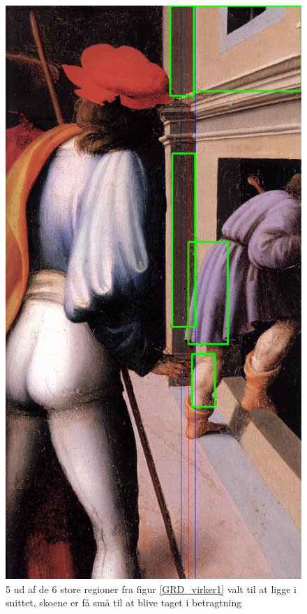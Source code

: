 \begin{figure}[h!!]
	\begin{center}
		\includegraphics[scale=0.3,angle=0]{afsnit/afprovning/billeder/naive_losning/naiv_kfarver_sdetaljer.png}
	\end{center}
	\caption[]{5 ud af de 6 store regioner fra figur \ref{GRD_virker1} valt til at ligge i snittet, skoene er få små til at blive taget i betragtning}
	\label{naiv_kfarver_sdetaljer}
\end{figure}

